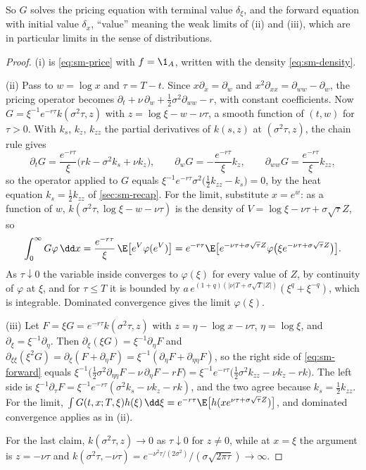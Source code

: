 So $G$ solves the pricing equation with terminal value $\delta_\xi$, and the forward equation with
initial value $\delta_x$, ``value'' meaning the weak limits of (ii) and (iii), which are in
particular limits in the sense of distributions.

\begin{proof}
(i) is \eqref{eq:sm-price} with $f=\1_A$, written with the density \eqref{eq:sm-density}.

(ii) Pass to $w=\log x$ and $\tau=T-t$. Since $x\partial_x=\partial_w$ and
$x^2\partial_{xx}=\partial_{ww}-\partial_w$, the pricing operator becomes
$\partial_t+\nu\,\partial_w+\frac12\sigma^2\partial_{ww}-r$, with constant coefficients. Now
$G=\xi^{-1}e^{-r\tau}k(\sigma^2\tau,z)$ with $z=\log\xi-w-\nu\tau$, a smooth function of $(t,w)$ for
$\tau>0$. With $k_s$, $k_z$, $k_{zz}$ the partial derivatives of $k(s,z)$ at $(\sigma^2\tau,z)$,
the chain rule gives
\[
  \partial_tG=\frac{e^{-r\tau}}{\xi}\big(rk-\sigma^2k_s+\nu k_z\big),\qquad
  \partial_wG=-\frac{e^{-r\tau}}{\xi}k_z,\qquad
  \partial_{ww}G=\frac{e^{-r\tau}}{\xi}k_{zz},
\]
so the operator applied to $G$ equals $\xi^{-1}e^{-r\tau}\sigma^2\big(\frac12k_{zz}-k_s\big)=0$, by
the heat equation $k_s=\frac12k_{zz}$ of \cref{sec:sm-recap}. For the limit, substitute $x=e^w$:
as a function of $w$, $k(\sigma^2\tau,\log\xi-w-\nu\tau)$ is the density of
$V=\log\xi-\nu\tau+\sigma\sqrt\tau Z$, so
\[
  \int_0^\infty G\varphi\,\dd x=\frac{e^{-r\tau}}{\xi}\,\E\big[e^{V}\varphi(e^{V})\big]
  =e^{-r\tau}\E\big[e^{-\nu\tau+\sigma\sqrt\tau Z}\varphi\big(\xi e^{-\nu\tau+\sigma\sqrt\tau Z}\big)\big].
\]
As $\tau\downarrow0$ the variable inside converges to $\varphi(\xi)$ for every value of $Z$, by
continuity of $\varphi$ at $\xi$, and for $\tau\le T$ it is bounded by
$a\,e^{(1+q)(|\nu|T+\sigma\sqrt T|Z|)}(\xi^q+\xi^{-q})$, which is integrable. Dominated convergence
gives the limit $\varphi(\xi)$.

(iii) Let $F=\xi G=e^{-r\tau}k(\sigma^2\tau,z)$ with $z=\eta-\log x-\nu\tau$, $\eta=\log\xi$, and
$\partial_\xi=\xi^{-1}\partial_\eta$. Then $\partial_\xi(\xi G)=\xi^{-1}\partial_\eta F$ and
$\partial_{\xi\xi}(\xi^2G)=\partial_\xi(F+\partial_\eta F)=\xi^{-1}(\partial_\eta F+\partial_{\eta\eta}F)$, so
the right side of \eqref{eq:sm-forward} equals
$\xi^{-1}\big(\frac12\sigma^2\partial_{\eta\eta}F-\nu\,\partial_\eta F-rF\big)
=\xi^{-1}e^{-r\tau}\big(\frac12\sigma^2k_{zz}-\nu k_z-rk\big)$. The left side is
$\xi^{-1}\partial_\tau F=\xi^{-1}e^{-r\tau}(\sigma^2k_s-\nu k_z-rk)$, and the two agree because
$k_s=\frac12k_{zz}$. For the limit, $\int G(t,x;T,\xi)h(\xi)\,\dd\xi=e^{-r\tau}\E\big[h(xe^{\nu\tau+\sigma\sqrt\tau Z})\big]$,
and dominated convergence applies as in (ii).

For the last claim, $k(\sigma^2\tau,z)\to0$ as $\tau\downarrow0$ for $z\ne0$, while at $x=\xi$ the
argument is $z=-\nu\tau$ and $k(\sigma^2\tau,-\nu\tau)=e^{-\nu^2\tau/(2\sigma^2)}/(\sigma\sqrt{2\pi\tau})\to\infty$.
\end{proof}

